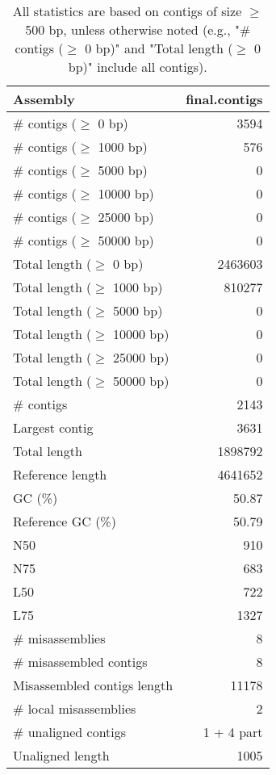 \documentclass[12pt,a4paper]{article}
\begin{document}
\begin{table}[ht]
\begin{center}
\caption{All statistics are based on contigs of size $\geq$ 500 bp, unless otherwise noted (e.g., "\# contigs ($\geq$ 0 bp)" and "Total length ($\geq$ 0 bp)" include all contigs).}
\begin{tabular}{|l*{1}{|r}|}
\hline
Assembly & final.contigs \\ \hline
\# contigs ($\geq$ 0 bp) & 3594 \\ \hline
\# contigs ($\geq$ 1000 bp) & 576 \\ \hline
\# contigs ($\geq$ 5000 bp) & 0 \\ \hline
\# contigs ($\geq$ 10000 bp) & 0 \\ \hline
\# contigs ($\geq$ 25000 bp) & 0 \\ \hline
\# contigs ($\geq$ 50000 bp) & 0 \\ \hline
Total length ($\geq$ 0 bp) & 2463603 \\ \hline
Total length ($\geq$ 1000 bp) & 810277 \\ \hline
Total length ($\geq$ 5000 bp) & 0 \\ \hline
Total length ($\geq$ 10000 bp) & 0 \\ \hline
Total length ($\geq$ 25000 bp) & 0 \\ \hline
Total length ($\geq$ 50000 bp) & 0 \\ \hline
\# contigs & 2143 \\ \hline
Largest contig & 3631 \\ \hline
Total length & 1898792 \\ \hline
Reference length & 4641652 \\ \hline
GC (\%) & 50.87 \\ \hline
Reference GC (\%) & 50.79 \\ \hline
N50 & 910 \\ \hline
N75 & 683 \\ \hline
L50 & 722 \\ \hline
L75 & 1327 \\ \hline
\# misassemblies & 8 \\ \hline
\# misassembled contigs & 8 \\ \hline
Misassembled contigs length & 11178 \\ \hline
\# local misassemblies & 2 \\ \hline
\# unaligned contigs & 1 + 4 part \\ \hline
Unaligned length & 1005 \\ \hline

\end{tabular}
\end{center}
\end{table}
\end{document}

